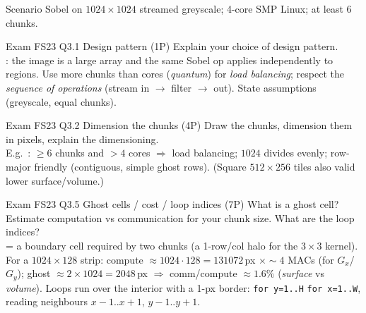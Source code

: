 \begin{concept}{Scenario}
    Sobel on $1024\times1024$ streamed greyscale; 4-core SMP Linux; at least 6 chunks.
\end{concept}

\begin{example2}{Exam FS23 Q3.1 Design pattern (1P)}
    Explain your choice of design pattern.
     \\ 
    : the image is a large array and the same Sobel op applies independently to regions. Use more chunks than cores (\emph{quantum}) for \emph{load balancing}; respect the \emph{sequence of operations} (stream in $\to$ filter $\to$ out). State assumptions (greyscale, equal chunks).
\end{example2}

\begin{example2}{Exam FS23 Q3.2 Dimension the chunks (4P)}
    Draw the chunks, dimension them in pixels, explain the dimensioning.
     \\ 
    E.g.\ : $\geq6$ chunks and $>4$ cores $\Rightarrow$ load balancing; $1024$ divides evenly; row-major friendly (contiguous, simple ghost rows). (Square $512\times256$ tiles also valid lower surface/volume.)
\end{example2}

\begin{example2}{Exam FS23 Q3.5 Ghost cells / cost / loop indices (7P)}
    What is a ghost cell? Estimate computation vs communication for your chunk size. What are the loop indices?
     \\ 
     = a boundary cell required by two chunks (a 1-row/col halo for the $3\times3$ kernel). For a $1024\times128$ strip: compute $\approx 1024\cdot128 = 131072$\,px $\times\sim4$ MACs (for $G_x$/$G_y$); ghost $\approx 2\times1024 = 2048$\,px $\Rightarrow$ comm/compute $\approx 1.6\%$ (\emph{surface} vs \emph{volume}). Loops run over the interior with a 1-px border: \texttt{for y=1..H} \texttt{for x=1..W}, reading neighbours $x\!-\!1..x\!+\!1$, $y\!-\!1..y\!+\!1$.
\end{example2}
